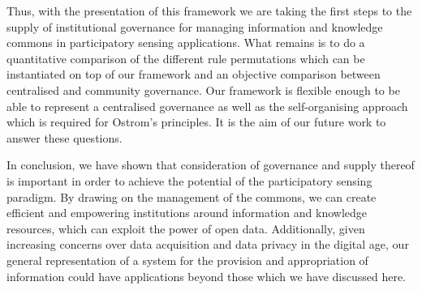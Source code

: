 Thus, with the presentation of this framework we are taking the first steps to the supply of institutional governance for managing information and knowledge commons in participatory sensing applications.
What remains is to do a quantitative comparison of the different rule permutations which can be instantiated on top of our framework and an objective comparison between centralised and community governance. 
Our framework is flexible enough to be able to represent a centralised governance as well as the self-organising approach which is required for Ostrom's principles. 
It is the aim of our future work to answer these questions.

In conclusion, we have shown that consideration of governance and supply thereof is important in order to achieve the potential of the participatory sensing paradigm. 
By drawing on the management of the commons, we can create efficient and empowering institutions around information and knowledge resources, which can exploit the power of open data. 
Additionally, given increasing concerns over data acquisition and data privacy in the digital age, our general representation of a system for the provision and appropriation of information could have applications beyond those which we have discussed here.